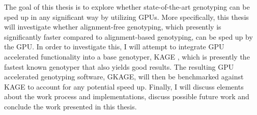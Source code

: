 The goal of this thesis is to explore whether state-of-the-art genotyping can be sped up in any significant way by utilizing GPUs.
More specifically, this thesis will investigate whether alignment-free genotyping, which presently is significantly faster compared to alignment-based genotyping, can be sped up by the GPU.
In order to investigate this, I will attempt to integrate GPU accelerated functionality into a base genotyper, KAGE \cite{kage}, which is presently the fastest known genotyper that also yields good results.
The resulting GPU accelerated genotyping software, GKAGE, will then be benchmarked against KAGE to account for any potential speed up.
Finally, I will discuss elements about the work process and implementations, discuss possible future work and conclude the work presented in this thesis.
